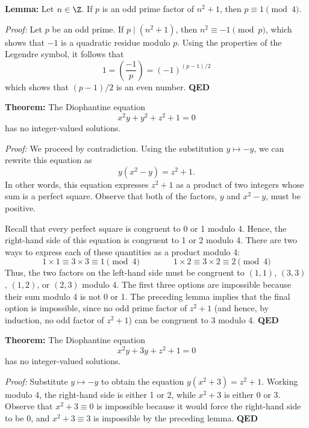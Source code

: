 \textbf{Lemma:} Let $n \in \Z$. If $p$ is an odd prime factor of $n^2 + 1$, then $p \equiv 1 \pmod 4$.

\textit{Proof:} Let $p$ be an odd prime. If $p \mid (n^2 + 1)$, then $n^2 \equiv -1 \pmod p$, which shows that $-1$ is a quadratic residue modulo $p$. Using the properties of the Legendre symbol, it follows that
\[ 1 = \left( \frac{-1}{p} \right) = (-1)^{(p-1)/2} \]
which shows that $(p-1)/2$ is an even number. \textbf{QED}

\textbf{Theorem:} The Diophantine equation
\[ x^2 y + y^2 + z^2 + 1 = 0 \]
has no integer-valued solutions.

\textit{Proof:} We proceed by contradiction. Using the substitution $y \mapsto -y$, we can rewrite this equation as
\[ y(x^2 - y) = z^2 + 1. \]
In other words, this equation expresses $z^2 + 1$ as a product of two integers whose sum is a perfect square. Observe that both of the factors, $y$ and $x^2 - y$, must be positive.

Recall that every perfect square is congruent to 0 or 1 modulo 4. Hence, the right-hand side of this equation is congruent to 1 or 2 modulo 4. There are two ways to express each of these quantities as a product modulo 4:
\[ 1 \times 1 \equiv 3 \times 3 \equiv 1 \pmod 4 \qquad\qquad 1 \times 2 \equiv 3 \times 2 \equiv 2 \pmod 4 \]
Thus, the two factors on the left-hand side must be congruent to $(1, 1)$, $(3, 3)$, $(1, 2)$, or $(2, 3)$ modulo 4. The first three options are impossible because their sum modulo 4 is not 0 or 1. The preceding lemma implies that the final option is impossible, since no odd prime factor of $z^2 + 1$ (and hence, by induction, no odd factor of $z^2 + 1$) can be congruent to 3 modulo 4. \textbf{QED}

\textbf{Theorem:} The Diophantine equation
\[ x^2 y + 3y + z^2 + 1 = 0 \]
has no integer-valued solutions.

\textit{Proof:} Substitute $y \mapsto -y$ to obtain the equation $y(x^2 + 3) = z^2 + 1$. Working modulo 4, the right-hand side is either 1 or 2, while $x^2 + 3$ is either 0 or 3. Observe that $x^2 + 3 \equiv 0$ is impossible because it would force the right-hand side to be 0, and $x^2 + 3 \equiv 3$ is impossible by the preceding lemma. \textbf{QED}
